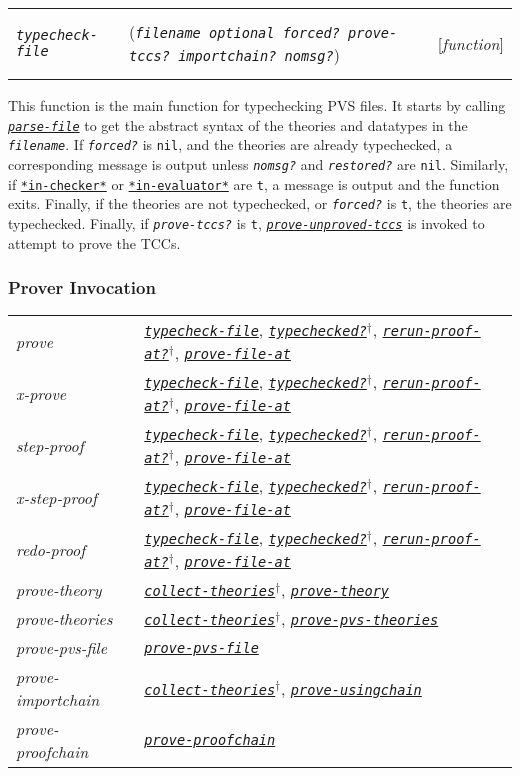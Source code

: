 \documentclass[12pt]{book}
\makeatletter
\def\ampoptional{{\smaller\sc {\smaller\smaller \&}optional\ }}
\newenvironment{function}[3]%
{\par\noindent\begin{boxedminipage}{\textwidth}%
 \par\noindent\begin{tabularx}{\linewidth}{l>{\raggedright}Xr}%
 \functionhtgt{#1}&(\texttt{\textit{#2}})&[\emph{#3}]%
 \end{tabularx}\par\flushright\begin{minipage}{.97\textwidth}}
{\end{minipage}\end{boxedminipage}}
\newcommand{\functionarg}[1]{\texttt{\textit{#1}}}
\newcommand{\functionnm}[1]{\texttt{\textit{#1}}}
\newcommand{\functionhln}[1]{\hyperlink{#1}{\functionnm{#1}}}
\newcommand{\functionhtgt}[1]{\hypertarget{#1}{\functionnm{#1}}\index{#1@\functionnm{#1}|underline}}
\newenvironment{lispfunction}[2]%
{\begin{function}{#1}{#2}{function}}{\end{function}}
\newcommand{\globalnm}[1]{\texttt{\textup{#1}}}
\newcommand{\globalhln}[1]{\hyperlink{#1}{\globalnm{#1}}}
\makeatother
\begin{document}
\begin{lispfunction}{typecheck-file}
  {filename \ampoptional forced? prove-tccs? importchain? nomsg?}  This
function is the main function for typechecking PVS files.  It starts by
calling \functionhln{parse-file} to get the abstract syntax of the
theories and datatypes in the \functionarg{filename}.  If
\functionarg{forced?} is \texttt{nil}, and the theories are already
typechecked, a corresponding message is output unless \functionarg{nomsg?}
and \functionarg{restored?} are \texttt{nil}.  Similarly, if
\globalhln{*in-checker*} or \globalhln{*in-evaluator*} are \texttt{t}, a
message is output and the function exits.  Finally, if the theories are
not typechecked, or \functionarg{forced?} is \texttt{t}, the theories are
typechecked.  Finally, if \functionarg{prove-tccs?} is \texttt{t},
\functionhln{prove-unproved-tccs} is invoked to attempt to prove the TCCs.
\end{lispfunction}

\subsubsection{Prover Invocation}
\noindent\begin{tabularx}{\linewidth}{|>{\itshape\ttfamily}l|>{\raggedright\arraybackslash}X|}\hline
  prove & \functionhln{typecheck-file},
          \functionhln{typechecked?}$^\dagger$,
          \functionhln{rerun-proof-at?}$^\dagger$,
          \functionhln{prove-file-at} \\
  x-prove & \functionhln{typecheck-file},
            \functionhln{typechecked?}$^\dagger$,
            \functionhln{rerun-proof-at?}$^\dagger$,
            \functionhln{prove-file-at} \\
  step-proof & \functionhln{typecheck-file},
               \functionhln{typechecked?}$^\dagger$,
               \functionhln{rerun-proof-at?}$^\dagger$,
               \functionhln{prove-file-at} \\
  x-step-proof & \functionhln{typecheck-file},
                 \functionhln{typechecked?}$^\dagger$,
                 \functionhln{rerun-proof-at?}$^\dagger$,
                 \functionhln{prove-file-at} \\
  redo-proof & \functionhln{typecheck-file},
               \functionhln{typechecked?}$^\dagger$,
               \functionhln{rerun-proof-at?}$^\dagger$,
               \functionhln{prove-file-at} \\
  prove-theory & \functionhln{collect-theories}$^\dagger$,
                 \functionhln{prove-theory} \\
  prove-theories & \functionhln{collect-theories}$^\dagger$,
                   \functionhln{prove-pvs-theories} \\
  prove-pvs-file & \functionhln{prove-pvs-file} \\
  prove-importchain & \functionhln{collect-theories}$^\dagger$,
                      \functionhln{prove-usingchain} \\
  prove-proofchain & \functionhln{prove-proofchain} \\ \hline
\end{tabularx}
\end{document}
